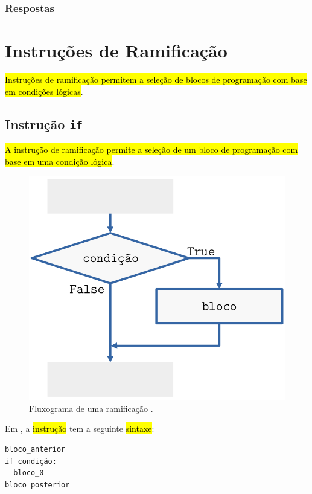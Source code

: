 \ifisbook
\subsubsection{Respostas}
\shipoutAnswer
\fi


\section{Instruções de Ramificação}\label{cap_progest_sec_ramifica}

\hl{Instruções de ramificação permitem a seleção de blocos de programação com base em condições lógicas}.

\subsection{Instrução \texttt{if}}

\hl{A instrução de ramificação {\PYTHONif} permite a seleção de um bloco de programação com base em uma condição lógica}.

\begin{figure}[H]
  \centering
  \includegraphics{./cap_progest/dados/fig_fg_if/fig.png}
  \caption{Fluxograma de uma ramificação {\PYTHONif}.}
  \label{cap_progest_sec_ramifica:fig:fg_if}
\end{figure}

Em {\python}, a \hl{instrução {\PYTHONif}} tem a seguinte \hl{sintaxe}:

\begin{lstlisting}
bloco_anterior
if condição:
  bloco_0
bloco_posterior
\end{lstlisting}

